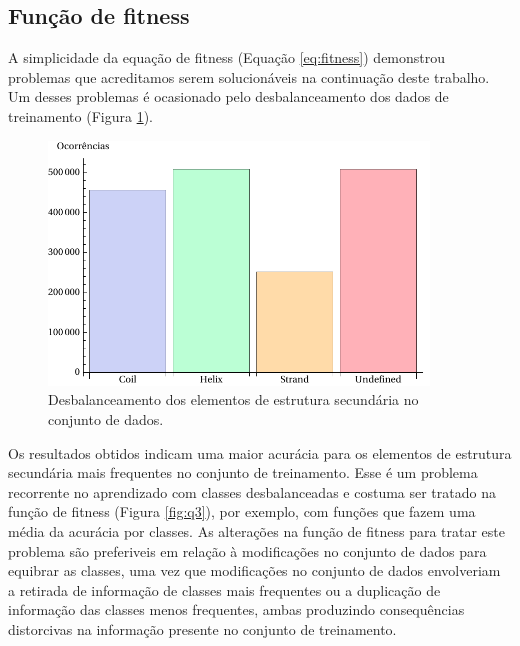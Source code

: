 \subsection{Função de fitness}

A simplicidade da equação de fitness (Equação \ref{eq:fitness}) demonstrou problemas que acreditamos serem solucionáveis na continuação deste trabalho. Um desses problemas é ocasionado pelo desbalanceamento dos dados de treinamento (Figura \ref{fig:occ_ss}). 

\begin{figure}
  \centering
  \includegraphics[width=0.9\textwidth]{figures/occ_ss.pdf}
  \caption{Desbalanceamento dos elementos de estrutura secundária no conjunto de dados.}
        \label{fig:occ_ss}
\end{figure}

Os resultados obtidos indicam uma maior acurácia para os elementos de estrutura secundária mais frequentes no conjunto de treinamento. Esse é um problema recorrente no aprendizado com classes desbalanceadas e costuma ser tratado na função de fitness (Figura \ref{fig:q3}), por exemplo, com funções que fazem uma média da acurácia por classes. As alterações na função de fitness para tratar este problema são preferiveis em relação à modificações no conjunto de dados para equibrar as classes, uma vez que modificações no conjunto de dados envolveriam a retirada de informação de classes mais frequentes ou a duplicação de informação das classes menos frequentes, ambas produzindo consequências distorcivas na informação presente no conjunto de treinamento.



